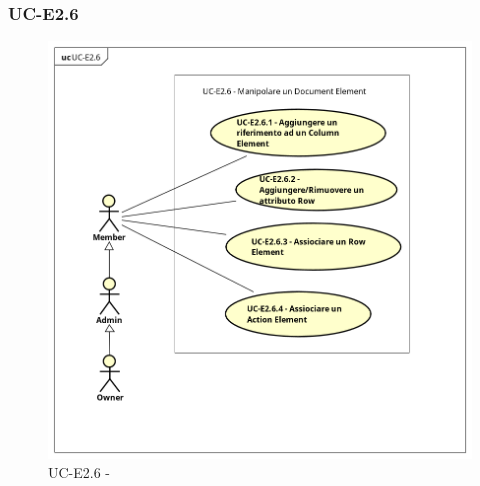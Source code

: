\subsubsection{UC-E2.6}
 

    \begin{figure}[H]
      \begin{center}
        \includegraphics[width=12cm]{res/img/UCEditor/UC-E2.6.png}
      \caption{UC-E2.6 - }
      \end{center} 
    \end{figure}


